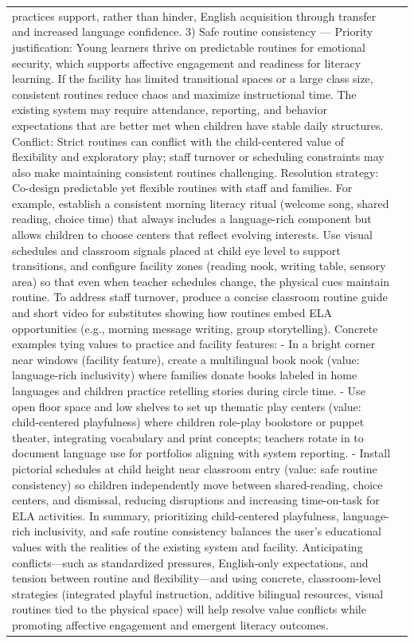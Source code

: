\begin{longtable}{@{}l p{12.5cm}@{}}
practices support, rather than hinder, English acquisition through transfer and increased language confidence. 3) Safe routine consistency --- Priority justification: Young learners thrive on predictable routines for emotional security, which supports affective engagement and readiness for literacy learning. If the facility has limited transitional spaces or a large class size, consistent routines reduce chaos and maximize instructional time. The existing system may require attendance, reporting, and behavior expectations that are better met when children have stable daily structures. Conflict: Strict routines can conflict with the child-centered value of flexibility and exploratory play; staff turnover or scheduling constraints may also make maintaining consistent routines challenging. Resolution strategy: Co-design predictable yet flexible routines with staff and families. For example, establish a consistent morning literacy ritual (welcome song, shared reading, choice time) that always includes a language-rich component but allows children to choose centers that reflect evolving interests. Use visual schedules and classroom signals placed at child eye level to support transitions, and configure facility zones (reading nook, writing table, sensory area) so that even when teacher schedules change, the physical cues maintain routine. To address staff turnover, produce a concise classroom routine guide and short video for substitutes showing how routines embed ELA opportunities (e.g., morning message writing, group storytelling). Concrete examples tying values to practice and facility features: - In a bright corner near windows (facility feature), create a multilingual book nook (value: language-rich inclusivity) where families donate books labeled in home languages and children practice retelling stories during circle time. - Use open floor space and low shelves to set up thematic play centers (value: child-centered playfulness) where children role-play bookstore or puppet theater, integrating vocabulary and print concepts; teachers rotate in to document language use for portfolios aligning with system reporting. - Install pictorial schedules at child height near classroom entry (value: safe routine consistency) so children independently move between shared-reading, choice centers, and dismissal, reducing disruptions and increasing time-on-task for ELA activities. In summary, prioritizing child-centered playfulness, language-rich inclusivity, and safe routine consistency balances the user's educational values with the realities of the existing system and facility. Anticipating conflicts---such as standardized pressures, English-only expectations, and tension between routine and flexibility---and using concrete, classroom-level strategies (integrated playful instruction, additive bilingual resources, visual routines tied to the physical space) will help resolve value conflicts while promoting affective engagement and emergent literacy outcomes. \\

\end{longtable}
